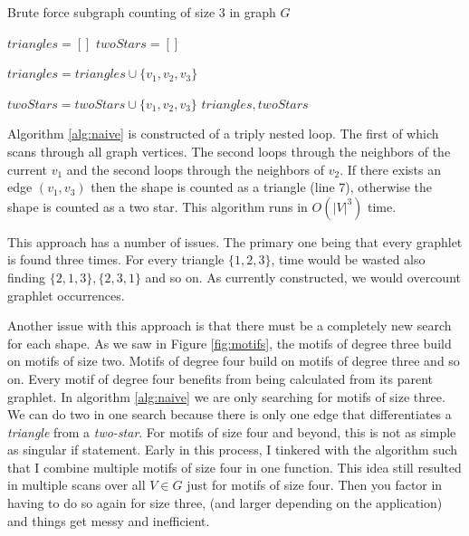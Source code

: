 \documentclass[12pt,twoside]{reedthesis}
\begin{document}
\begin{algorithm}
\caption{Brute force subgraph counting of size 3 in graph $G$}
\label{alg:naive}
\begin{algorithmic}[1]

    \State $triangles = []$
    \State $twoStars = []$
    
        \State $triangles = triangles \cup \{v_1, v_2, v_3\}$
    
    \Else
         \State $twoStars = twoStars \cup \{v_1, v_2, v_3\}$
    \EndIf
    \EndFor
    \EndFor
    \EndFor
    \State \Return $triangles, twoStars$
    
\EndFunction

\end{algorithmic}
\end{algorithm}

Algorithm \ref{alg:naive} is constructed of a triply nested loop. The first of which scans through all graph vertices. The second loops through the neighbors of the current $v_1$ and the second loops through the neighbors of $v_2$. If there exists an edge $(v_1,v_3)$ then the shape is counted as a triangle (line 7), otherwise the shape is counted as a two star. This algorithm runs in $O(|V|^3)$ time.

This approach has a number of issues. The primary one being that every graphlet is found three times. For every triangle $\{1,2,3\}$, time would be wasted also finding $\{2,1,3\}, \{2,3,1\}$ and so on. As currently constructed, we would overcount graphlet occurrences.
	
Another issue with this approach is that there must be a completely new search for each shape. As we saw in Figure \ref{fig:motifs}, the motifs of degree three build on motifs of size two. Motifs of degree four build on motifs of degree three and so on. Every motif of degree four benefits from being calculated from its parent graphlet. In algorithm \ref{alg:naive} we are only searching for motifs of size three. We can do two in one search because there is only one edge that differentiates a \textit{triangle} from a \textit{two-star}. For motifs of size four and beyond, this is not as simple as singular if statement. Early in this process, I tinkered with the algorithm such that I combine multiple motifs of size four in one function. This idea still resulted in multiple scans over all $V \in G$ just for motifs of size four. Then you factor in having to do so again for size three, (and larger depending on the application) and things get messy and inefficient. 
	
\end{document}
